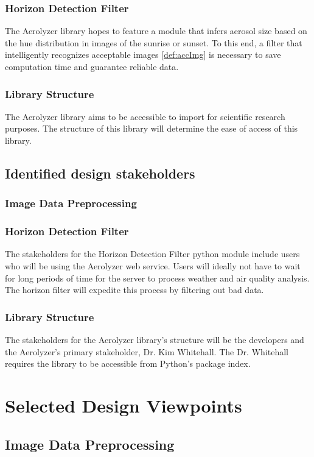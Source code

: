 \documentclass[onecolumn, draftclsnofoot,10pt, compsoc]{IEEEtran}
\begin{document}
\begin{singlespace}
        \subsubsection{Horizon Detection Filter}
        The Aerolyzer library hopes to feature a module that infers aerosol size based on the hue distribution in images of the sunrise or sunset. To this end, a filter that intelligently recognizes acceptable images \ref{def:accImg} is necessary to save computation time and guarantee reliable data.
        \subsubsection{Library Structure}
        The Aerolyzer library aims to be accessible to import for scientific research purposes. The structure of this library will determine the ease of access of this library.
	\subsection{Identified design stakeholders}
    	\subsubsection{Image Data Preprocessing}
        
        \subsubsection{Horizon Detection Filter}
        The stakeholders for the Horizon Detection Filter python module include users who will be using the Aerolyzer web service. Users will ideally not have to wait for long periods of time for the server to process weather and air quality analysis. The horizon filter will expedite this process by filtering out bad data.
        \subsubsection{Library Structure}
        The stakeholders for the Aerolyzer library’s structure will be the developers and the Aerolyzer’s primary stakeholder, Dr. Kim Whitehall. The Dr. Whitehall requires the library to be accessible from Python’s package index.
\section{Selected Design Viewpoints}
	\subsection{Image Data Preprocessing}

\end{singlespace}
\end{document}
